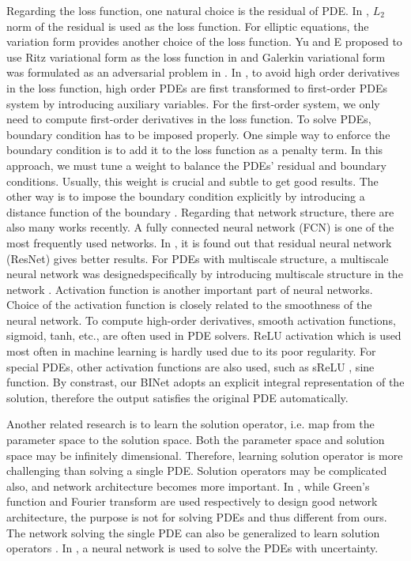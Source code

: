 \documentclass[hyperref]{article}
\numberwithin{equation}{section}
\theoremstyle{nonumberplain}
\begin{document}
	Regarding the loss function,  
	one natural choice is the residual of PDE. In \cite{raissi2019physics, sirignano2018dgm}, $L_2$ norm of the residual is used as the loss function. For elliptic equations, the variation form provides another choice of the loss function. Yu and E proposed to use Ritz variational form as the loss function in \cite{weinan2018deep} and Galerkin variational form was formulated as an adversarial problem in \cite{zang2020weak}. In \cite{cai2020deep, lyu2020mim}, to avoid high order derivatives in the loss function, high order PDEs are first transformed to first-order PDEs system by introducing auxiliary variables. For the first-order system, we only need to compute first-order derivatives in the loss function.
	To solve PDEs, boundary condition has to be imposed properly. One simple way to enforce the boundary condition is to add it to the loss function as a penalty term. 
	In this approach, we must tune a weight to balance the PDEs' residual and boundary conditions. Usually, this weight is crucial and subtle to get good results. 
	The other way is to impose the boundary condition explicitly by introducing a distance function of the boundary \cite{berg2018unified}. Regarding that network structure, there are also many works recently. A fully connected neural network (FCN) is one of the most frequently used networks. In \cite{weinan2018deep}, it is found out that residual neural network (ResNet) gives better results. For PDEs with multiscale structure, a multiscale neural network was designedspecifically by introducing multiscale structure in the network \cite{cai2019multi}. Activation function is another important part of neural networks. Choice of the activation function is closely related to the smoothness of the neural network. To compute high-order derivatives, smooth activation functions, sigmoid, tanh, etc., are often used in PDE solvers. ReLU activation which is used most often in machine learning is hardly used due to its poor regularity. For special PDEs, other activation functions are also used, such as sReLU \cite{cai2019multi}, sine function\cite{sitzmann2020implicit}. By constrast, our BINet adopts an explicit integral representation of the solution, therefore the output satisfies the original PDE automatically. 
	
	
	Another related research is to learn the solution operator, i.e. map from the parameter space to the solution space. Both the parameter space and solution space may be infinitely dimensional. Therefore, learning solution operator is more challenging than solving a single PDE. Solution operators may be complicated also, and network architecture becomes more important. In \cite{gin2020deepgreen,li2020fourier}, while Green's function and Fourier transform are used respectively to design good network architecture, the purpose is not for solving PDEs and thus different from ours. The network solving the single PDE can also be generalized to learn solution operators \cite{cai2021deepm,gao2020phygeonet,lu2019deeponet}. In \cite{khoo2017solving,yang2018physics,yang2019adversarial}, a neural network is used to solve the PDEs with uncertainty. 
	
\end{document}
